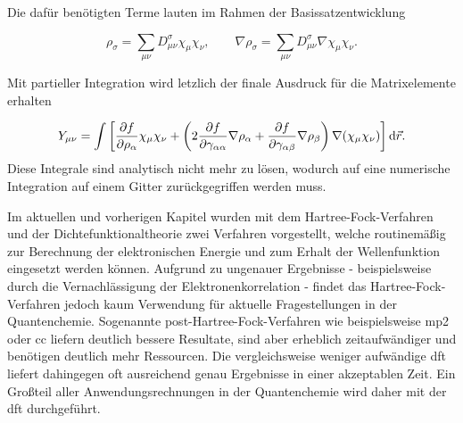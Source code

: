Die dafür benötigten Terme lauten im Rahmen der Basissatzentwicklung

\begin{equation}
 \rho_\sigma=\sum_{\mu\nu}D^\sigma_{\mu\nu}\chi_\mu\chi_\nu, \qquad \nabla\rho_\sigma=\sum_{\mu\nu}D^\sigma_{\mu\nu}\nabla\chi_\mu\chi_\nu.
\end{equation}

Mit partieller Integration wird letzlich der finale Ausdruck für die Matrixelemente erhalten

\begin{equation}
Y_{\mu\nu}=\int\left[\frac{\partial f}{\partial\rho_\alpha}\chi_\mu\chi_\nu+\left(2\frac{\partial f}{\partial \gamma_{\alpha\alpha}}\nabla\rho_\alpha+\frac{\partial f}{\partial \gamma_{\alpha\beta}}\nabla\rho_\beta\right)\nabla(\chi_\mu\chi_\nu)\right]\mathop{}\!\mathrm{d} \vec{r}.
\end{equation}
Diese Integrale sind analytisch nicht mehr zu lösen, wodurch auf eine numerische Integration auf einem Gitter zurückgegriffen werden muss.

\bigskip
Im aktuellen und vorherigen Kapitel wurden mit dem Hartree-Fock-Verfahren und der Dichtefunktionaltheorie zwei Verfahren vorgestellt, welche routinemäßig zur Berechnung der elektronischen Energie und zum Erhalt der Wellenfunktion eingesetzt werden können. Aufgrund zu ungenauer Ergebnisse - beispielsweise durch die Vernachlässigung der Elektronenkorrelation - findet das Hartree-Fock-Verfahren jedoch kaum Verwendung für aktuelle Fragestellungen in der Quantenchemie. Sogenannte post-Hartree-Fock-Verfahren wie beispielsweise \ac{mp2} oder \ac{cc} liefern deutlich bessere Resultate, sind aber erheblich zeitaufwändiger und benötigen deutlich mehr Ressourcen. Die vergleichsweise weniger aufwändige \ac{dft} liefert dahingegen oft ausreichend genau Ergebnisse in einer akzeptablen Zeit. Ein Großteil aller Anwendungsrechnungen in der Quantenchemie wird daher mit der \ac{dft} durchgeführt. 

